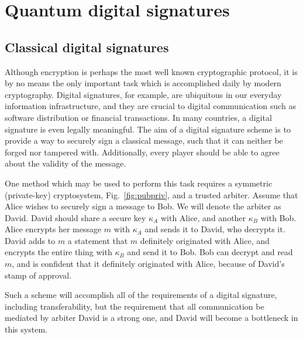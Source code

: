 \section{Quantum digital signatures}\label{sec:lit_review_qds}


\subsection{Classical digital signatures}

Although encryption is perhaps the most well known cryptographic protocol, it is by no means the only important task which is accomplished daily by modern cryptography. Digital signatures, for example, are ubiquitous in our everyday information infrastructure, and they are crucial to digital communication such as software distribution or financial transactions. In many countries, a digital signature is even legally meaningful. The aim of a digital signature scheme is to provide a way to securely sign a classical message, such that it can neither be forged nor tampered with. Additionally, every player should be able to agree about the validity of the message. 

One method which may be used to perform this task requires a symmetric (private-key) cryptosystem, Fig.~\ref{fig:pubpriv}, and a trusted arbiter. Assume that Alice wishes to securely sign a message to Bob. We will denote the arbiter as David. David should share a secure key $\kappa_A$ with Alice, and another $\kappa_B$ with Bob. Alice encrypts her message $m$ with $\kappa_A$ and sends it to David, who decrypts it. David adds to $m$ a statement that $m$ definitely originated with Alice, and encrypts the entire thing with $\kappa_B$ and send it to Bob. Bob can decrypt and read $m$, and is confident that it definitely originated with Alice, because of David's stamp of approval.

Such a scheme will accomplish all of the requirements of a digital signature, including transferability, but the requirement that all communication be mediated by arbiter David is a strong one, and David will become a bottleneck in this system.

